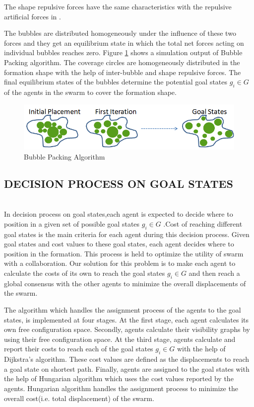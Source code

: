 \documentclass[letterpaper, 10 pt, conference]{ieeeconf}  %
\begin{document}
The shape repulsive forces have the same characteristics with the repulsive artificial forces in \cite{17}.
	
The bubbles are distributed homogeneously under the influence of these two forces and they get an equilibrium state in which the total net forces acting on individual bubbles reaches zero. Figure \ref{buble_ornek} shows a simulation output of Bubble Packing algorithm. The coverage circles are homogeneously distributed in the formation shape with the help of inter-bubble and shape repulsive forces. The final equilibrium states of the bubbles determine the potential goal states $g_i \in G$  of the agents in the swarm to cover the formation shape.

\begin{figure}[thpb]
      \centering     
      \includegraphics[scale = 0.3]{bubble_packing2}
    \caption{Bubble Packing Algorithm} \label{buble_ornek}
\end{figure} 
	
\subsection{DECISION PROCESS ON GOAL STATES}\hspace{0pt} \label{DecisionProcess Ref} \\
In decision process on goal states,each agent is expected to decide where to position in a given set of possible goal states $g_i \in G$ .Cost of reaching different goal states is the main criteria for each agent during this decision process. Given goal states and cost values to these goal states, each agent decides where to position in the formation. This process is held to optimize the utility of swarm with a collaboration. Our solution for this problem is to make each agent to calculate the costs of its own to reach the goal states $g_i \in G$ and then reach a global consensus with the other agents to minimize the overall displacements of the swarm. 

The algorithm which handles the assignment process of the agents to the goal states, is implemented at four stages. At the first stage, each agent calculates its own free configuration space. Secondly, agents calculate their visibility graphs by using their free configuration space. At the third stage,  agents calculate and report their costs to reach each of the goal states $g_i \in G$ with the help of Dijkstra's algorithm. These cost values are defined as the displacements to reach a goal state on shortest path.  Finally, agents are assigned to the goal states with the help of Hungarian algorithm which uses the cost values reported by the agents. Hungarian algorithm handles the assignment process to minimize the overall cost(i.e. total displacement) of the swarm.
	
\end{document}
